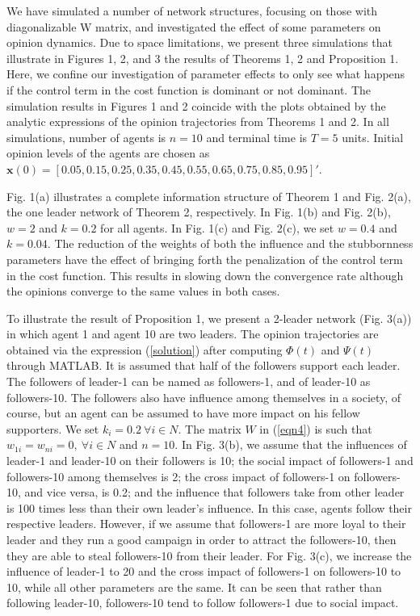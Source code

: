 \documentclass[10pt, conference, compsocconf]{IEEEtran}
\begin{document}
We have simulated a number of network structures, focusing on those with diagonalizable W matrix, and investigated the effect of some parameters on opinion dynamics. Due to space limitations, we present three simulations that illustrate in Figures 1, 2, and 3 the results of Theorems 1, 2 and Proposition 1. Here, we confine our investigation of parameter effects to only see what happens if the control term in the cost function is dominant or not dominant. The simulation results in Figures 1 and 2 coincide with the plots obtained by the analytic expressions of the opinion trajectories from Theorems 1 and 2. In all simulations, number of agents is $n=10$ and terminal time is $T=5$ units. Initial opinion levels of the agents are chosen as $\mathbf{x}(0) = [0.05, 0.15, 0.25, 0.35, 0.45, 0.55, 0.65, 0.75, 0.85, 0.95]'$.

Fig. 1(a) illustrates  a complete information structure of Theorem 1 and Fig. 2(a), the one leader network of Theorem 2, respectively. In Fig. 1(b) and Fig. 2(b), $w=2$ and $k=0.2$ for all agents. In Fig. 1(c) and Fig. 2(c), we set $w=0.4$ and $k=0.04$. The reduction of the weights of both the influence and the stubbornness parameters have the effect of bringing forth the penalization of the control term in the cost function. This results in slowing down the convergence rate although the opinions converge to the same values in both cases.

To illustrate the result of Proposition 1, we present a 2-leader network (Fig. 3(a)) in which agent 1 and agent 10 are two leaders. The opinion trajectories are obtained via the expression (\ref{solution}) after computing $\Phi(t)$ and $\Psi(t)$ through MATLAB. It is assumed that half of the followers support each leader. The followers of leader-1 can be named as followers-1, and of leader-10 as followers-10. The followers also have influence among themselves in a society, of course, but an agent can be assumed to have more impact on his fellow supporters. We set $k_i=0.2 \ \forall i\in N$. The matrix $W$ in (\ref{eqn4}) is such that $w_{1i}=w_{ni}=0, \ \forall i\in N$ and $n=10$. In Fig. 3(b), we assume that the influences of leader-1 and leader-10 on their followers is 10; the social impact of followers-1 and followers-10 among themselves is 2; the cross impact of followers-1 on followers-10, and vice versa, is 0.2; and the influence that followers take from other leader is 100 times less than their own leader's influence. In this case, agents follow their respective leaders. However, if we assume that followers-1 are more loyal to their leader and they run a good campaign in order to attract the followers-10, then they are able to steal followers-10 from their leader. For Fig. 3(c), we increase the influence of leader-1 to 20 and the cross impact of followers-1 on followers-10 to 10, while all other parameters are the same. It can be seen that rather than following leader-10, followers-10 tend to follow followers-1 due to social impact.
\end{document}

